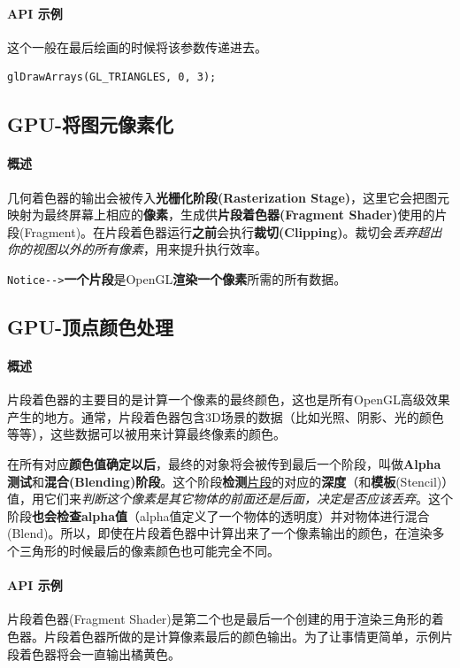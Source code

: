 \documentclass[UTF8,a4paper,12pt]{ctexbook}
\begin{document}
			\paragraph{API 示例}
				这个一般在最后绘画的时候将该参数传递进去。
				
				\begin{lstlisting}
glDrawArrays(GL_TRIANGLES, 0, 3);				
				\end{lstlisting}
				
		
		\subsection{GPU-将图元像素化}
			\paragraph{概述}		
				几何着色器的输出会被传入\textbf{光栅化阶段(Rasterization Stage)}，这里它会把图元映射为最终屏幕上相应的\textbf{像素}，生成供\textbf{片段着色器(Fragment Shader)}使用的片段(Fragment)。在片段着色器运行\textbf{之前}会执行\textbf{裁切(Clipping)}。裁切会\textit{丢弃超出你的视图以外的所有像素}，用来提升执行效率。
				
				\verb|Notice-->|\textbf{一个片段}是OpenGL\textbf{渲染一个像素}所需的所有数据。
			
			
		\subsection{GPU-顶点颜色处理}
			\paragraph{概述}		
				片段着色器的主要目的是计算一个像素的最终颜色，这也是所有OpenGL高级效果产生的地方。通常，片段着色器包含3D场景的数据（比如光照、阴影、光的颜色等等），这些数据可以被用来计算最终像素的颜色。
				
				在所有对应\textbf{颜色值确定以后}，最终的对象将会被传到最后一个阶段，叫做\textbf{Alpha测试}和\textbf{混合(Blending)阶段}。这个阶段\textbf{检测}\underline{片段}的对应的\textbf{深度}（和\textbf{模板}(Stencil)）值，用它们来\textit{判断这个像素是其它物体的前面还是后面，决定是否应该丢弃}。这个阶段\textbf{也会检查alpha值}（alpha值定义了一个物体的透明度）并对物体进行混合(Blend)。所以，即使在片段着色器中计算出来了一个像素输出的颜色，在渲染多个三角形的时候最后的像素颜色也可能完全不同。
				
			\paragraph{API 示例}
				片段着色器(Fragment Shader)是第二个也是最后一个创建的用于渲染三角形的着色器。片段着色器所做的是计算像素最后的颜色输出。为了让事情更简单，示例片段着色器将会一直输出橘黄色。
				
\end{document}
